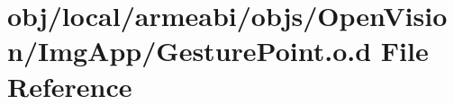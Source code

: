 \hypertarget{objs_2_open_vision_2_img_app_2_gesture_point_8o_8d}{\section{obj/local/armeabi/objs/\-Open\-Vision/\-Img\-App/\-Gesture\-Point.o.\-d \-File \-Reference}
\label{objs_2_open_vision_2_img_app_2_gesture_point_8o_8d}
}
